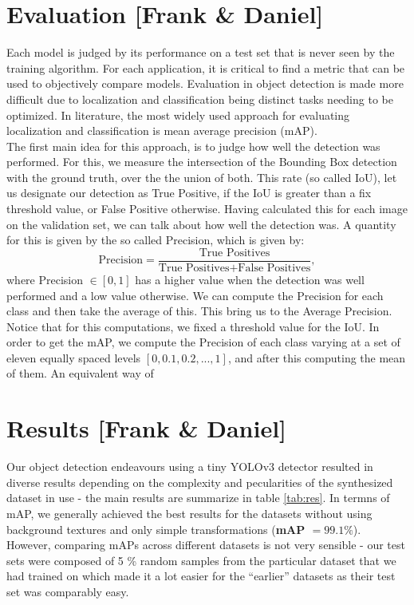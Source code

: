 \documentclass[a4paper]{article}
\begin{document}
\section{Evaluation [Frank \& Daniel]}
Each model is judged by its performance on a test set that is never seen by the training algorithm. For each application, it is critical to find a metric that can be used to objectively compare models.
Evaluation in object detection is made more difficult due to localization and classification being distinct tasks needing to be optimized.  
In literature, the most widely used approach for evaluating localization and classification is mean average precision (mAP).  \\
The first main idea for this approach, is to judge how well the detection was performed.  For this, we measure the intersection of the Bounding Box detection with the ground truth, over the the union of both.  This rate (so called IoU), let us designate our detection as True Positive, if the IoU is greater than a fix threshold value, or False Positive otherwise.
Having calculated this for each image on the validation set, we can talk about how well the detection was.  A quantity for this is given by the so called Precision, which is given by:
\[\text{Precision} = \frac{\text{True Positives}}{\text{True Positives}+\text{False Positives}}, \]
where Precision $\in [0,1]$ has a higher value when the detection was well performed and a low value otherwise.
We can compute the Precision for each class and then take the average of this.  This bring us to the Average Precision. \\
Notice that for this computations, we fixed a threshold value for the IoU.   In order to get the mAP, we compute the Precision of each class varying at a set of eleven equally spaced levels 
$[0, 0.1, 0.2, ... , 1]$, and after this computing the mean of them. 
An equivalent way of 

\section{Results [Frank \& Daniel]}
Our object detection endeavours using a tiny YOLOv3 detector resulted in diverse results depending on the complexity and pecularities of the synthesized dataset in use - the main results are summarize in table \ref{tab:res}. In termns of mAP, we generally achieved the best results for the datasets without using background textures and only simple transformations (\textbf{mAP $=99.1 \%$}). However, comparing mAPs across different datasets is not very sensible - our test sets were composed of 5 \% random samples from the particular dataset that we had trained on which made it a lot easier for the ``earlier'' datasets as their test set was comparably easy.
\end{document}
